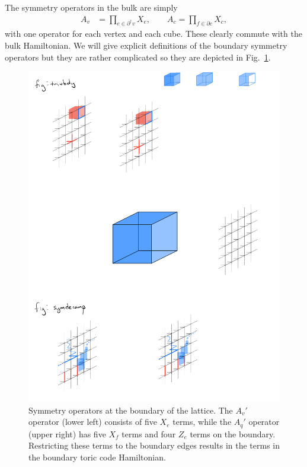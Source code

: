 \documentclass[twocolumn, longbibliography]{revtex4-2}
\newcommand{\pardag}{\partial^\dagger\!}
\begin{document}
The symmetry operators in the bulk are simply 
\begin{align}
A_v &= \prod_{e\in\pardag v} X_e,\qquad A_c = \prod_{f\in \partial c}X_c,
\end{align}
with one operator for each vertex and each cube. These clearly commute with the bulk Hamiltonian. We will give explicit definitions of the boundary symmetry operators but they are rather complicated so they are depicted  in Fig.~\ref{fig:trivbdy}.

\begin{figure}
\centering
\includegraphics{trivbdy}
\caption{Symmetry operators at the boundary of the lattice. The $A_v'$ operator (lower left) consists of five $X_e$ terms, while the $A_q'$ operator (upper right) has five $X_f$ terms and four $Z_e$ terms on the boundary. Restricting these terms to the boundary edges results in the terms in the boundary toric code Hamiltonian.}
\label{fig:trivbdy}
\end{figure}
\end{document}
